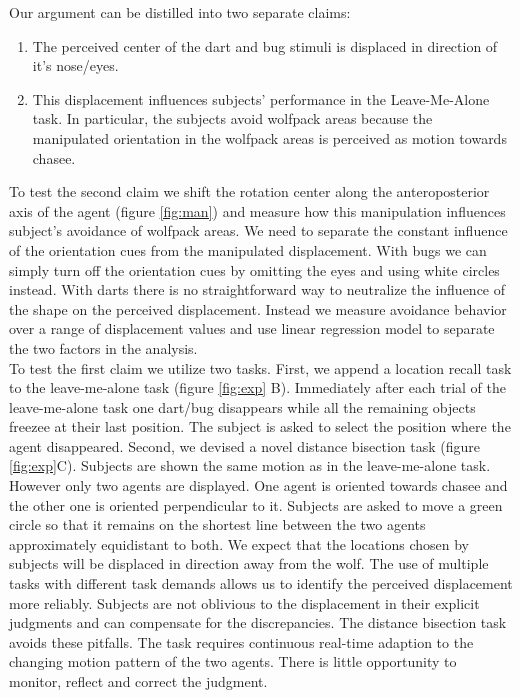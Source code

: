 \documentclass[10pt]{article}
\begin{document}
Our argument can be distilled into two separate claims:
\begin{enumerate}
  \item The perceived center of the dart and bug stimuli is displaced in direction of it's nose/eyes.
  \item This displacement influences subjects' performance in the Leave-Me-Alone task. 
In particular, the subjects avoid wolfpack areas because the manipulated orientation in the wolfpack areas is perceived as motion towards chasee.
\end{enumerate}  
To test the second claim we shift the rotation center along the anteroposterior axis of the agent (figure \ref{fig:man}) and measure how this manipulation influences subject's avoidance of wolfpack areas. We need to separate the constant influence of the orientation cues from the manipulated displacement. With bugs we can simply turn off the orientation cues by omitting the eyes and using white circles instead. With darts there is no straightforward way to neutralize the influence of the shape on the perceived displacement. Instead we measure avoidance behavior over a range of displacement values and use linear regression model to separate the two factors in the analysis.\\
To test the first claim we utilize two tasks. 
First, we append a location recall task to the leave-me-alone task (figure \ref{fig:exp} B). 
Immediately after each trial of the leave-me-alone task one dart/bug disappears while all the remaining objects freezee at their last position. 
The subject is asked to select the position where the agent disappeared.
Second, we devised a novel distance bisection task (figure \ref{fig:exp}C). 
Subjects are shown the same motion as in the leave-me-alone task. 
However only two agents are displayed. 
One agent is oriented towards chasee and the other one is oriented perpendicular to it. 
Subjects are asked to move a green circle so that it remains on the shortest line between the two agents approximately equidistant to both. 
We expect that the locations chosen by subjects will be displaced in direction away from the wolf. 
The use of multiple tasks with different task demands allows us to identify the perceived displacement more reliably. 
Subjects are not oblivious to the displacement in their explicit judgments and can compensate for the discrepancies. %
The distance bisection task avoids these pitfalls.
The task requires continuous real-time adaption to the changing motion pattern of the two agents. 
There is little opportunity to monitor, reflect and correct the judgment. 
\end{document}

